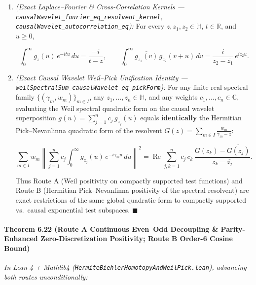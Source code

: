 \documentclass[
  11pt,
]{article}
\begin{document}
\begin{enumerate}
\def\labelenumi{\arabic{enumi}.}
\item
  \emph{(Exact Laplace--Fourier \& Cross-Correlation Kernels ---
  \texttt{causalWavelet\_fourier\_eq\_resolvent\_kernel},
  \texttt{causalWavelet\_autocorrelation\_eq}):} For every
  \(z, z_1, z_2 \in \mathbb{H}\), \(t \in \mathbb{R}\), and \(u \ge 0\),

  \[\int_0^\infty g_z(u)\,e^{-itu}\,du = \frac{-i}{t - z}, \qquad \int_0^\infty \overline{g_{z_1}(v)}\,g_{z_2}(v + u)\,dv = \frac{i}{z_2 - \overline{z_1}}\,e^{iz_2 u}.\]
\item
  \emph{(Exact Causal Wavelet Weil--Pick Unification Identity ---
  \texttt{weilSpectralSum\_causalWavelet\_eq\_pickForm}):} For any
  finite real spectral family \(\{(\gamma_m, w_m)\}_{m \in I}\), any
  \(z_1, \dots, z_n \in \mathbb{H}\), and any weights
  \(c_1, \dots, c_n \in \mathbb{C}\), evaluating the Weil spectral
  quadratic form on the causal wavelet superposition
  \(g(u) = \sum_{j=1}^n c_j\,g_{z_j}(u)\) equals \textbf{identically}
  the Hermitian Pick--Nevanlinna quadratic form of the resolvent
  \(G(z) = \sum_{m \in I} \frac{w_m}{\gamma_m - z}\):

  \[\sum_{m \in I} w_m \left\|\sum_{j=1}^n c_j \int_0^\infty g_{z_j}(u)\,e^{-i\gamma_m u}\,du\right\|^2 = \operatorname{Re}\sum_{j,k=1}^n \overline{c_j}\,c_k\,\frac{G(z_k) - \overline{G(z_j)}}{z_k - \overline{z_j}}.\]

  Thus Route A (Weil positivity on compactly supported test functions)
  and Route B (Hermitian Pick--Nevanlinna positivity of the spectral
  resolvent) are exact restrictions of the same global quadratic form to
  compactly supported vs.~causal exponential test subspaces.
  \(\blacksquare\)
\end{enumerate}

\paragraph{Theorem 6.22 (Route A Continuous Even--Odd Decoupling \&
Parity-Enhanced Zero-Discretization Positivity; Route B Order-6 Cosine
Bound)}\label{theorem-6.22-route-a-continuous-evenodd-decoupling-parity-enhanced-zero-discretization-positivity-route-b-order-6-cosine-bound}

\emph{In Lean 4 + Mathlib4
(\texttt{HermiteBiehlerHomotopyAndWeilPick.lean}), advancing both routes
unconditionally:}
\end{document}
